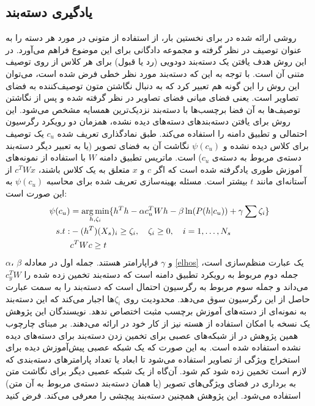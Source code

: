 \subsection{یادگیری دسته‌بند}\label{learnclassifer}
روشی ارائه شده در \cite{ mohamed13} برای نخستین بار، از استفاده از متونی در مورد هر دسته را به عنوان توصیف در نظر گرفته و مجموعه دادگانی برای این موضوع فراهم می‌آورد. در این روش هدف یافتن یک دسته‌بند دودویی (رد یا قبول) برای هر کلاس از روی توصیف متنی آن است. با توجه به این که دسته‌بند مورد نظر خطی فرض شده است، می‌توان این روش را این گونه هم تعبیر کرد که به دنبال نگاشتن متون توصیف‌کننده به فضای تصاویر است. یعنی فضای میانی فضای تصاویر در نظر گرفته شده و پس از نگاشتن توصیف‌ها به آن فضا برچسب‌ها با دسته‌بند نزدیک‌ترین همسایه مشخص می‌شود. این روش برای یافتن دسته‌بندهای دسته‌های دیده نشده، همزمان دو رویکرد رگرسیون احتمالی و تطبیق دامنه را استفاده می‌کند. طبق نمادگذاری تعریف شده  $c_u$ یک توصیف برای کلاس دیده نشده  و $\psi(c_u)$ نگاشت آن به فضای تصویر (یا به تعبیر دیگر دسته‌بند دسته‌ی مربوط به دسته‌ی $c_u$) است. ماتریس تطبیق دامنه $W$ با استفاده از نمونه‌های آموزش طوری یادگرفته شده است که اگر $c$ و $x$ متعلق به یک کلاس باشند، $c^TWx$ از آستانه‌ای مانند $t$ بیشتر است. مسئله بهینه‌سازی تعریف شده برای محاسبه  $\psi(c_u)$ به این صورت است:
\begin{align}\label{elhos}
\psi(c_u) &= \operatorname*{arg\,min}_{h, \zeta_i} \{ h^Th  - \alpha c_u^TWh - \beta \ln(P(h|c_u)) + \gamma \sum \zeta_i \} \\
s.t: & -(h^T)(X_s)_i \geq \zeta_i, \quad \zeta_i \geq 0, \quad i=1,\ldots, N_s  \nonumber \\
& c^TWc \geq t \nonumber
\end{align}
$\alpha$، $\beta$ 
و $\gamma$ فراپارامتر هستند. جمله اول در معادله \eqref{elhos} یک عبارت منظم‌سازی است، جمله دوم مربوط به رویکرد تطبیق دامنه است که دسته‌بند تخمین زده شده را $c_y^TW$ می‌داند و جمله سوم مربوط به رگرسیون احتمال است که دسته‌بند را به سمت عبارت حاصل از این رگرسیون سوق می‌دهد. محدودیت روی $\zeta_i$ها اجبار می‌کند که این دسته‌بند به نمونه‌ای از دسته‌های آموزش برچسب مثبت اختصاص ندهد. نویسندگان این پژوهش یک نسخه با امکان استفاده از هسته نیز از کار خود در 
\cite{elhoseiny2015} 
ارائه می‌دهند. بر مبنای چارچوب همین پژوهش در  \cite{ba2015} از شبکه‌های عصبی برای تخمین زدن دسته‌بند برای دسته‌های دیده نشده استفاده شده است. به این صورت که یک شبکه عصبی پیش‌آموزش دیده برای استخراج ویژگی از تصاویر استفاده می‌شود تا ابعاد یا تعداد پارامترهای دسته‌بندی که لازم است تخمین زده شود کم شود. آن‌گاه از یک شبکه عصبی دیگر برای نگاشت متن به برداری در فضای ویژگی‌های تصویر (یا همان دسته‌بند دسته‌ی مربوط به آن متن) استفاده می‌شود. این پژوهش همچنین دسته‌بند پیچشی  را معرفی می‌کند. فرض کنید 
